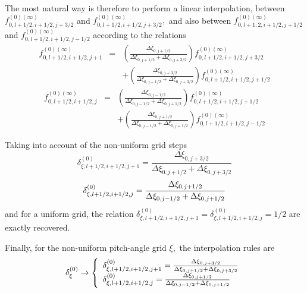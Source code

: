 The most natural way is therefore to perform a linear interpolation, between
$f_{0,l+1/2,i+1/2,j+3/2}^{\left( 0\right) (\infty )}$ and $%
f_{0,l+1/2,i+1/2,j+3/2}^{\left( 0\right) (\infty )},$ and also between $%
f_{0,l+1:2,i+1/2,j+1/2}^{\left( 0\right) (\infty )}$ and $%
f_{0,l+1/2,i+1/2,j-1/2}^{\left( 0\right) (\infty )}$ according to the
relations
\begin{eqnarray}
f_{0,l+1/2,i+1/2,j+1}^{\left( 0\right) (\infty )} &=&\left( \frac{\Delta \xi
_{0,j+1/2}}{\Delta \xi _{0,j+1/2}+\Delta \xi _{0,j+3/2}}\right)
f_{0,l+1/2,i+1/2,j+3/2}^{\left( 0\right) (\infty )}  \nonumber \\
&&+\left( \frac{\Delta \xi _{0,j+3/2}}{\Delta \xi _{0,j+1/2}+\Delta \xi
_{0,j+3/2}}\right) f_{0,l+1/2,i+1/2,j+1/2}^{\left( 0\right) (\infty )}
\end{eqnarray}
\begin{eqnarray}
f_{0,l+1/2,i+1/2,j}^{\left( 0\right) (\infty )} &=&\left( \frac{\Delta \xi
_{0,j-1/2}}{\Delta \xi _{0,j-1/2}+\Delta \xi _{0,j+1/2}}\right)
f_{0,l+1/2,i+1/2,j+1/2}^{\left( 0\right) (\infty )}  \nonumber \\
&&+\left( \frac{\Delta \xi _{0,j+1/2}}{\Delta \xi _{0,j-1/2}+\Delta \xi
_{0,j+1/2}}\right) f_{0,l+1/2,i+1/2,j-1/2}^{\left( 0\right) (\infty )}
\end{eqnarray}

Taking into account of the non-uniform grid steps
\begin{equation}
\delta _{\xi ,l+1/2,i+1/2,j+1}^{\left( 0\right) }=\frac{\Delta \xi _{0,j+3/2}%
}{\Delta \xi _{0,j+1/2}+\Delta \xi _{0,j+3/2}}
\end{equation}
\begin{equation}
\delta _{\xi ,l+1/2,i+1/2,j}^{\left( 0\right) }=\frac{\Delta \xi _{0,j+1/2}}{%
\Delta \xi _{0,j-1/2}+\Delta \xi _{0,j+1/2}}
\end{equation}
and for a uniform grid, the relation $\delta _{\xi ,l+1/2,i+1/2,j+1}^{\left(
0\right) }=\delta _{\xi ,l+1/2,i+1/2,j}^{\left( 0\right) }=1/2$ are exactly
recovered.

Finally, for the non-uniform pitch-angle grid $\xi ,$ the interpolation
rules are
\begin{equation}
\delta _{\xi }^{\left( 0\right) }\rightarrow \left\{
\begin{array}{l}
\delta _{\xi ,l+1/2,i+1/2,j+1}^{\left( 0\right) }=\frac{\Delta \xi _{0,j+3/2}%
}{\Delta \xi _{0,j+1/2}+\Delta \xi _{0,j+3/2}} \\
\delta _{\xi ,l+1/2,i+1/2,j}^{\left( 0\right) }=\frac{\Delta \xi _{0,j+1/2}}{%
\Delta \xi _{0,j-1/2}+\Delta \xi _{0,j+1/2}}
\end{array}
\right.
\end{equation}

